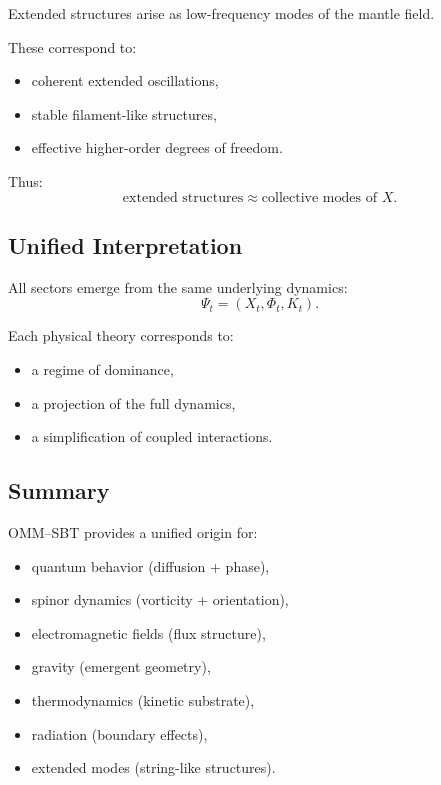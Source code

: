 \documentclass[11pt]{article}
\begin{document}
Extended structures arise as low-frequency modes of the mantle field.

These correspond to:
\begin{itemize}
\item coherent extended oscillations,
\item stable filament-like structures,
\item effective higher-order degrees of freedom.
\end{itemize}

Thus:
\begin{equation}
\text{extended structures} \approx \text{collective modes of } X.
\end{equation}

\subsection{Unified Interpretation}

All sectors emerge from the same underlying dynamics:
\begin{equation}
\Psi_t = (X_t, \Phi_t, K_t).
\end{equation}

Each physical theory corresponds to:
\begin{itemize}
\item a regime of dominance,
\item a projection of the full dynamics,
\item a simplification of coupled interactions.
\end{itemize}

\subsection{Summary}

OMM--SBT provides a unified origin for:

\begin{itemize}
\item quantum behavior (diffusion + phase),
\item spinor dynamics (vorticity + orientation),
\item electromagnetic fields (flux structure),
\item gravity (emergent geometry),
\item thermodynamics (kinetic substrate),
\item radiation (boundary effects),
\item extended modes (string-like structures).
\end{itemize}
\end{document}
